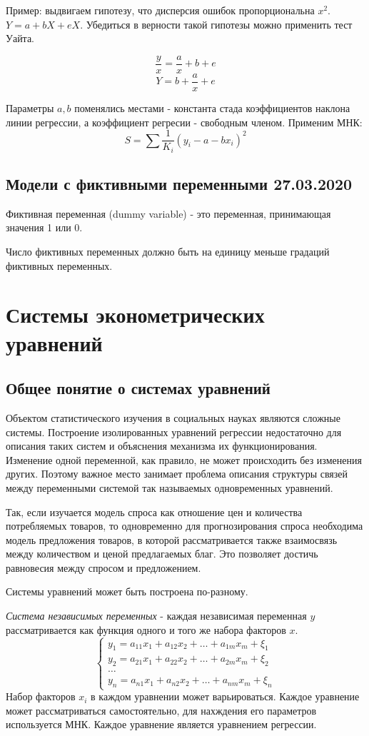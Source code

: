 \documentclass[aps,%
12pt,%
final,%
oneside,
onecolumn,%
musixtex, %
superscriptaddress,%
centertags]{article} %
\begin{document}
Пример: выдвигаем гипотезу, что дисперсия ошибок пропорциональна $x^2$. $Y=a+bX+eX$. Убедиться в верности такой гипотезы можно применить тест Уайта.

$$\frac{y}{x} = \frac{a}{x} + b + e$$
$$Y = b +\frac{a}{x} + e$$

Параметры $a,b$ поменялись местами - константа стада коэффициентов наклона линии регрессии, а коэффициент регресии - свободным членом.
Применим МНК:
$$ S = \sum \frac{1}{K_i}(y_i - a - bx_i)^2$$

\subsection{Модели с фиктивными переменными 27.03.2020}

Фиктивная переменная (dummy variable) - это переменная, принимающая значения 1 или 0. 

Число фиктивных переменных должно быть на единицу меньше градаций фиктивных переменных.
\newpage

\section{Системы эконометрических уравнений}

\subsection{Общее понятие о системах уравнений}

Объектом статистического изучения в социальных науках являются сложные системы. Построение изолированных уравнений
регрессии недостаточно для описания таких систем и объяснения механизма их функционирования. Изменение одной переменной, как правило, не может происходить без изменения других. Поэтому важное место занимает проблема описания структуры связей между переменными системой так называемых одновременных уравнений.

Так, если изучается модель спроса как отношение цен и количества потребляемых товаров, то одновременно для прогнозирования спроса необходима модель предложения товаров, в которой рассматривается также взаимосвязь между количеством и ценой предлагаемых благ. Это позволяет достичь равновесия между спросом и предложением.

Системы уравнений может быть построена по-разному.

\textit{Система независимых переменных} - каждая независимая переменная $y$ рассматривается как функция одного и того же набора факторов $x$.
$$\left \{
\begin{matrix}
	y_1 = a_{11}x_1 + a_{12}x_2 + \ldots + a_{1m}x_m + \xi_1 \\[0.3cm]
	y_2 =a_{21}x_1 + a_{22}x_2 + \ldots + a_{2m}x_m + \xi_2  \\[0.3cm]
	\ldots \\
	y_n = a_{n1}x_1 + a_{n2}x_2 + \ldots + a_{nm}x_m + \xi_n 
\end{matrix}
\right.
$$
Набор факторов $x_i$ в каждом уравнении может варьироваться. Каждое уравнение может рассматриваться самостоятельно, для нахждения его параметров используется МНК. Каждое уравнение является уравнением регрессии.
\end{document}

